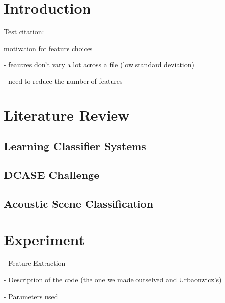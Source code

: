 \documentclass[11pt]{article}
\begin{document}
\begin{multicols}{2}

\section{Introduction}


Test citation: \cite{Anderson2016}

motivation for feature choices

- feautres don't vary a lot across a file (low standard deviation)

- need to reduce the number of features



\section{Literature Review}





\subsection{Learning Classifier Systems}





\subsection{DCASE Challenge}





\subsection{Acoustic Scene Classification}





\section{Experiment}



- Feature Extraction

- Description of the code (the one we made outselved and Urbaonwicz's)

- Parameters used








\end{multicols}
\end{document}
